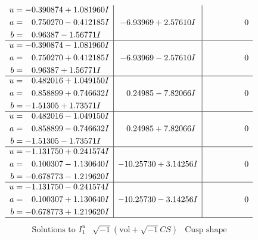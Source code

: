 \documentclass[1p]{elsarticle_modified}
\theoremstyle{definition}
\newcommand{\I}{\sqrt{-1}}
\begin{document}
$$\begin{array}{c|c|c}
\begin{aligned}
u &= -0.390874 + 1.081960 I \\
a &= \phantom{-}0.750270 - 0.412185 I \\
b &= \phantom{-}0.96387 - 1.56771 I\end{aligned}
 & -6.93969 + 2.57610 I & \phantom{-0.000000 } 0 \\ \hline\begin{aligned}
u &= -0.390874 - 1.081960 I \\
a &= \phantom{-}0.750270 + 0.412185 I \\
b &= \phantom{-}0.96387 + 1.56771 I\end{aligned}
 & -6.93969 - 2.57610 I & \phantom{-0.000000 } 0 \\ \hline\begin{aligned}
u &= \phantom{-}0.482016 + 1.049150 I \\
a &= \phantom{-}0.858899 + 0.746632 I \\
b &= -1.51305 + 1.73571 I\end{aligned}
 & \phantom{-}0.24985 - 7.82066 I & \phantom{-0.000000 } 0 \\ \hline\begin{aligned}
u &= \phantom{-}0.482016 - 1.049150 I \\
a &= \phantom{-}0.858899 - 0.746632 I \\
b &= -1.51305 - 1.73571 I\end{aligned}
 & \phantom{-}0.24985 + 7.82066 I & \phantom{-0.000000 } 0 \\ \hline\begin{aligned}
u &= -1.131750 + 0.241574 I \\
a &= \phantom{-}0.100307 - 1.130640 I \\
b &= -0.678773 - 1.219620 I\end{aligned}
 & -10.25730 + 3.14256 I & \phantom{-0.000000 } 0 \\ \hline\begin{aligned}
u &= -1.131750 - 0.241574 I \\
a &= \phantom{-}0.100307 + 1.130640 I \\
b &= -0.678773 + 1.219620 I\end{aligned}
 & -10.25730 - 3.14256 I & \phantom{-0.000000 } 0\\
 \hline 
 \end{array}$$\newpage$$\begin{array}{c|c|c}  
\text{Solutions to }I^u_{1}& \I (\text{vol} + \sqrt{-1}CS) & \text{Cusp shape}\\
 \hline 
\begin{aligned}

\end{aligned}
\end{array}$$
\end{document}
